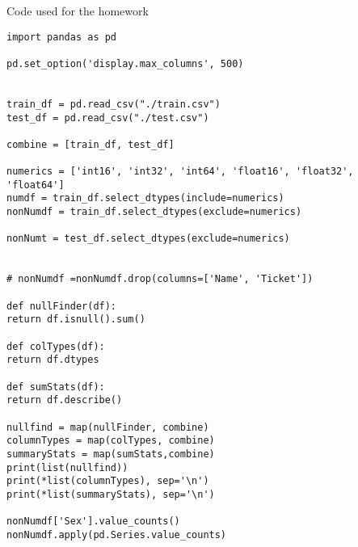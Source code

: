 \documentclass[11pt]{article}
\begin{document}
\clearpage

Code used for the homework



\begin{lstlisting}
import pandas as pd

pd.set_option('display.max_columns', 500)


train_df = pd.read_csv("./train.csv")
test_df = pd.read_csv("./test.csv")

combine = [train_df, test_df]

numerics = ['int16', 'int32', 'int64', 'float16', 'float32', 'float64']
numdf = train_df.select_dtypes(include=numerics)
nonNumdf = train_df.select_dtypes(exclude=numerics)

nonNumt = test_df.select_dtypes(exclude=numerics)


# nonNumdf =nonNumdf.drop(columns=['Name', 'Ticket'])

def nullFinder(df):
return df.isnull().sum()

def colTypes(df):
return df.dtypes

def sumStats(df):
return df.describe()

nullfind = map(nullFinder, combine)
columnTypes = map(colTypes, combine)
summaryStats = map(sumStats,combine)
print(list(nullfind))
print(*list(columnTypes), sep='\n')
print(*list(summaryStats), sep='\n')

nonNumdf['Sex'].value_counts()
nonNumdf.apply(pd.Series.value_counts)
\end{lstlisting}
\end{document}
